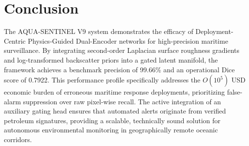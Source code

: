 \section{Conclusion}
The AQUA-SENTINEL V9 system demonstrates the efficacy of Deployment-Centric Physics-Guided Dual-Encoder networks for high-precision maritime surveillance. By integrating second-order Laplacian surface roughness gradients and log-transformed backscatter priors into a gated latent manifold, the framework achieves a benchmark precision of 99.66\% and an operational Dice score of 0.7922. This performance profile specifically addresses the $O(10^5)$ USD economic burden of erroneous maritime response deployments, prioritizing false-alarm suppression over raw pixel-wise recall. The active integration of an auxiliary gating head ensures that automated alerts originate from verified petroleum signatures, providing a scalable, technically sound solution for autonomous environmental monitoring in geographically remote oceanic corridors.
